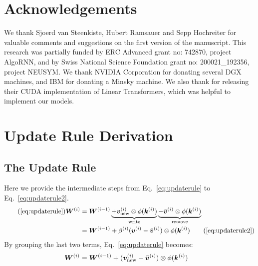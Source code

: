 \documentclass{article}
\theoremstyle{definition}
\begin{document}
\section*{Acknowledgements}
We thank Sjoerd van Steenkiste, Hubert Ramsauer and Sepp Hochreiter for valuable
comments and suggestions on the first version of the manuscript.
This research was partially funded by ERC Advanced grant no: 742870, project AlgoRNN,
and by Swiss National Science Foundation grant no: 200021\_192356, project NEUSYM.
We thank NVIDIA Corporation for donating several DGX
machines, and IBM for donating a Minsky machine.
We also thank \citet{katharopoulos2020transformers}
for releasing their CUDA implementation of Linear Transformers,
which was helpful to implement our models.





\clearpage
\appendix

\section{Update Rule Derivation}
\subsection{The Update Rule}
\label{app:update_rule}
Here we provide the intermediate steps from Eq.~\ref{eq:updaterule} to Eq.~\ref{eq:updaterule2}.
\begin{align}
\tag{\ref{eq:updaterule}}
\mW^{(i)} &= \mW^{(i-1)}
    \underbrace{+ \vv^{(i)}_\text{new} \otimes \phi(\vk^{(i)})}_{\text{write}} 
    \underbrace{- \bar{\vv}^{(i)} \otimes \phi(\vk^{(i)})}_{\text{remove}} \\
&= \mW^{(i-1)} + \beta^{(i)}(\vv^{(i)} - \bar{\vv}^{(i)}) \otimes \phi(\vk^{(i)})  \tag{\ref{eq:updaterule2}}
\end{align}
By grouping the last two terms, Eq.~\ref{eq:updaterule} becomes:
\begin{align}
{\bm{W}}^{(i)} &= {\bm{W}}^{(i-1)} + ({\bm{v}}^{(i)}_\text{new} - \bar{{\bm{v}}}^{(i)}) \otimes \phi({\bm{k}}^{(i)}) \label{eq:new_minus_bar}
\end{align}
\end{document}
